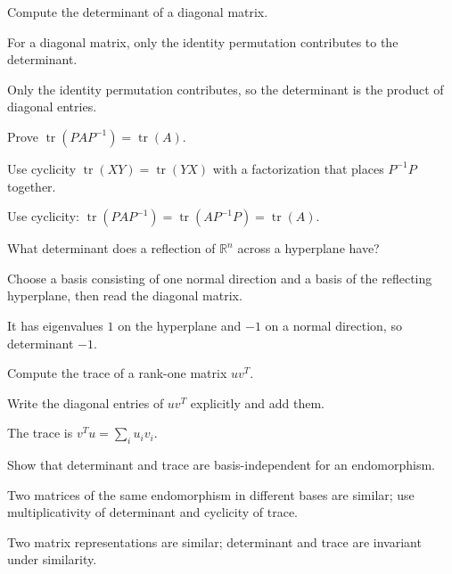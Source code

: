 \begin{exercise}\label{exr:i08-04}
Compute the determinant of a diagonal matrix.
\end{exercise}
\begin{hint}
For a diagonal matrix, only the identity permutation contributes to the determinant.
\end{hint}
\begin{solution}
Only the identity permutation contributes, so the determinant is the product of diagonal entries.
\end{solution}

\begin{exercise}\label{exr:i08-05}
Prove $\operatorname{tr}(PAP^{-1})=\operatorname{tr}(A)$.
\end{exercise}
\begin{hint}
Use cyclicity \(\operatorname{tr}(XY)=\operatorname{tr}(YX)\) with a factorization that places \(P^{-1}P\) together.
\end{hint}
\begin{solution}
Use cyclicity: $\operatorname{tr}(PAP^{-1})=\operatorname{tr}(AP^{-1}P)=\operatorname{tr}(A)$.
\end{solution}

\begin{exercise}\label{exr:i08-06}
What determinant does a reflection of $\mathbb R^n$ across a hyperplane have?
\end{exercise}
\begin{hint}
Choose a basis consisting of one normal direction and a basis of the reflecting hyperplane, then read the diagonal matrix.
\end{hint}
\begin{solution}
It has eigenvalues $1$ on the hyperplane and $-1$ on a normal direction, so determinant $-1$.
\end{solution}

\begin{exercise}\label{exr:i08-07}
Compute the trace of a rank-one matrix $uv^T$.
\end{exercise}
\begin{hint}
Write the diagonal entries of \(uv^T\) explicitly and add them.
\end{hint}
\begin{solution}
The trace is $v^Tu=\sum_i u_iv_i$.
\end{solution}

\begin{exercise}\label{exr:i08-08}
Show that determinant and trace are basis-independent for an endomorphism.
\end{exercise}
\begin{hint}
Two matrices of the same endomorphism in different bases are similar; use multiplicativity of determinant and cyclicity of trace.
\end{hint}
\begin{solution}
Two matrix representations are similar; determinant and trace are invariant under similarity.
\end{solution}


